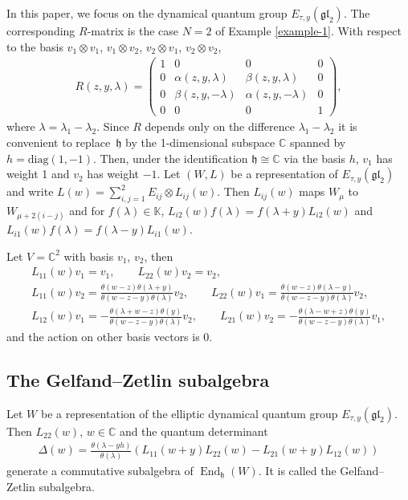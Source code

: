 \documentclass[pdftex]{sigma}
\numberwithin{equation}{section}
\begin{document}
In this paper, we focus on the dynamical quantum group $E_{\tau,y}(\mathfrak{gl}_2)$. The corresponding $R$-matrix is the case $N=2$ of Example \ref{example-1}. With respect to the basis $v_1\otimes v_1$, $v_1\otimes v_2$, $v_2\otimes v_1$, $v_2\otimes v_2$,
\begin{gather*}
R(z,y,\lambda)= \left(
 \begin{matrix}
 1 & 0 & 0 & 0\\
 0 & \alpha(z,y,\lambda) & \beta(z,y,\lambda) & 0\\
 0 & \beta(z,y,-\lambda) & \alpha(z,y,-\lambda) & 0\\
 0 & 0 & 0& 1
 \end{matrix} \right),
\end{gather*}
where $\lambda=\lambda_1-\lambda_2$. Since $R$ depends only on the difference $\lambda_1-\lambda_2$ it is convenient to replace~$\mathfrak h$ by the 1-dimensional subspace $\mathbb C$ spanned by $h=\mathrm{diag}(1,-1)$. Then, under the identification $\mathfrak h\cong \mathbb C$ via the basis $h$, $v_1$ has weight 1 and $v_2$ has weight $-1$. Let $(W,L)$ be a representation of $E_{\tau,y}(\mathfrak {gl}_2)$ and write $L(w)=\sum\limits_{i,j=1}^2 E_{ij}\otimes L_{ij}(w)$. Then $L_{ij}(w)$ maps $W_\mu$ to $W_{\mu+2(i-j)}$ and for $f(\lambda)\in \mathbb K$, $L_{i2}(w)f(\lambda) =f(\lambda+y)L_{i2}(w)$ and $L_{i1}(w)f(\lambda) =f(\lambda-y)L_{i1}(w)$.
\begin{Example} \label{example-2}Let $V=\mathbb C^2$ with basis $v_1$, $v_2$, then
 \begin{gather*}
 L_{11}(w)v_1=v_1,\qquad L_{22}(w)v_2=v_2,\\
 L_{11}(w)v_2= \frac {\theta(w-z)\theta(\lambda+y)} {\theta(w-z-y)\theta(\lambda)} v_2,\qquad
 L_{22}(w)v_1= \frac {\theta(w-z)\theta(\lambda-y)} {\theta(w-z-y)\theta(\lambda)} v_2,\\
 L_{12}(w)v_1 =-\frac{\theta(\lambda+w-z)\theta(y)} {\theta(w-z-y)\theta(\lambda)} v_2, \qquad
L_{21}(w)v_2=-\frac{\theta(\lambda-w+z)\theta(y)} {\theta(w-z-y)\theta(\lambda)} v_1,
 \end{gather*}
and the action on other basis vectors is 0.
\end{Example}

\subsection{The Gelfand--Zetlin subalgebra}
Let $W$ be a representation of the elliptic dynamical quantum group $E_{\tau,y}(\mathfrak{gl}_2)$. Then $L_{22}(w)$, $w\in\mathbb C$ and the quantum determinant \cite{FelderVarchenko}
\begin{gather}\label{e-determinant1}
 \Delta(w)=\frac{\theta(\lambda-y h)}{\theta(\lambda)} (L_{11}(w+y)L_{22}(w)-L_{21}(w+y)L_{12}(w))
\end{gather}
generate a commutative subalgebra of $\operatorname{End}_{\mathfrak h}(W)$. It is called the Gelfand--Zetlin subalgebra.
\end{document}
